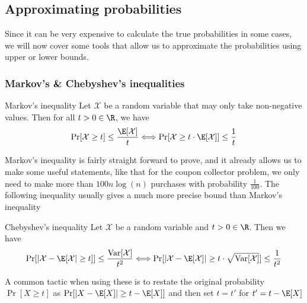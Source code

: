 \newpage
\subsection{Approximating probabilities}
Since it can be very expensive to calculate the true probabilities in some cases, we will now cover some tools that allow us to approximate the probabilities using upper or lower bounds.

\subsubsection{Markov's \& Chebyshev's inequalities}
\setcounter{all}{67}
\begin{theorem}[]{Markov's inequality}
    Let $\mathcal{X}$ be a random variable that may only take non-negative values. Then for all $t > 0 \in \R$, we have
    \begin{align*}
        \Pr[\mathcal{X} \geq t] \leq \frac{\E[\mathcal{X}]}{t} \Longleftrightarrow \Pr[\mathcal{X} \geq t \cdot \E[\mathcal{X}]] \leq \frac{1}{t}
    \end{align*}
\end{theorem}
Markov's inequality is fairly straight forward to prove, and it already allows us to make some useful statements, like that for the coupon collector problem, we only need to make more than $100 n \log(n)$ purchases with probability $\frac{1}{100}$. The following inequality usually gives a much more precise bound than Markov's inequality

\begin{theorem}[]{Chebyshev's inequality}
    Let $\mathcal{X}$ be a random variable and $t > 0 \in\R$. Then we have
    \begin{align*}
        \Pr[|\mathcal{X} - \E[\mathcal{X}| \geq t]] \leq \frac{\text{Var}[\mathcal{X}]}{t^2} \Longleftrightarrow \Pr[|\mathcal{X} - \E[\mathcal{X}]| \geq t \cdot \sqrt{\text{Var}[\mathcal{X}]}] \leq \frac{1}{t^2}
    \end{align*}
\end{theorem}

A common tactic when using these is to restate the original probability $\Pr[X \geq t]$ as $\Pr[|X - \E[X]| \geq t - \E[X]]$ and then set $t = t'$ for $t' = t - \E[X]$

